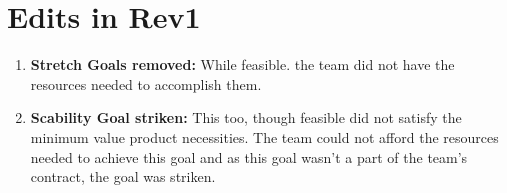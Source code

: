 \documentclass[fullpage]{article}
\newcommand{\be}{\begin{enumerate}}
\newcommand{\ee}{\end{enumerate}}
\newcommand{\bc}{\begin{center}}
\newcommand{\ec}{\end{center}}
\begin{document}
\section{Edits in Rev1}
\bc

\be
\item \textbf{Stretch Goals removed:} While feasible. the team did not have the resources needed to accomplish them.
\item \textbf{Scability Goal striken: }This too, though feasible did not satisfy the minimum value product necessities. The team could not afford the resources needed to achieve this goal and as this goal wasn't a part of the team's contract, the goal was striken.
\ee
\ec
\end{document}
